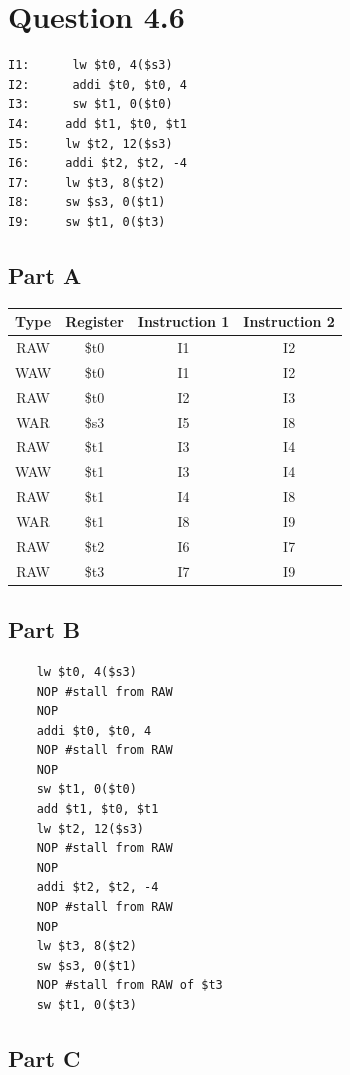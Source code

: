 \documentclass[11pt]{article} %
\begin{document}
\section{Question 4.6}

\begin{verbatim}
I1:      lw $t0, 4($s3)
I2:      addi $t0, $t0, 4
I3:      sw $t1, 0($t0)
I4:     add $t1, $t0, $t1
I5:     lw $t2, 12($s3)
I6:     addi $t2, $t2, -4
I7:     lw $t3, 8($t2)
I8:     sw $s3, 0($t1)
I9:     sw $t1, 0($t3)
\end{verbatim}

\subsection{Part A}

\begin{tabular}{c|c|c|c}
	Type & Register & Instruction 1 & Instruction 2\\\hline
	RAW & \$t0 & I1 & I2 \\
	WAW & \$t0 & I1 & I2 \\
	RAW & \$t0 & I2 & I3 \\
	WAR & \$s3 & I5 & I8 \\
	RAW & \$t1 & I3 & I4 \\
	WAW & \$t1 & I3 & I4 \\
	RAW & \$t1 & I4 & I8 \\
	WAR & \$t1 & I8 & I9 \\
	RAW & \$t2 & I6 & I7 \\
	RAW & \$t3 & I7 & I9 
\end{tabular}

\subsection{Part B}

\begin{verbatim}
    lw $t0, 4($s3)
    NOP #stall from RAW
    NOP
    addi $t0, $t0, 4
    NOP #stall from RAW
    NOP
    sw $t1, 0($t0)
    add $t1, $t0, $t1
    lw $t2, 12($s3)
    NOP #stall from RAW
    NOP
    addi $t2, $t2, -4
    NOP #stall from RAW
    NOP
    lw $t3, 8($t2)
    sw $s3, 0($t1)
    NOP #stall from RAW of $t3
    sw $t1, 0($t3)
\end{verbatim}

\subsection{Part C}
\end{document}
